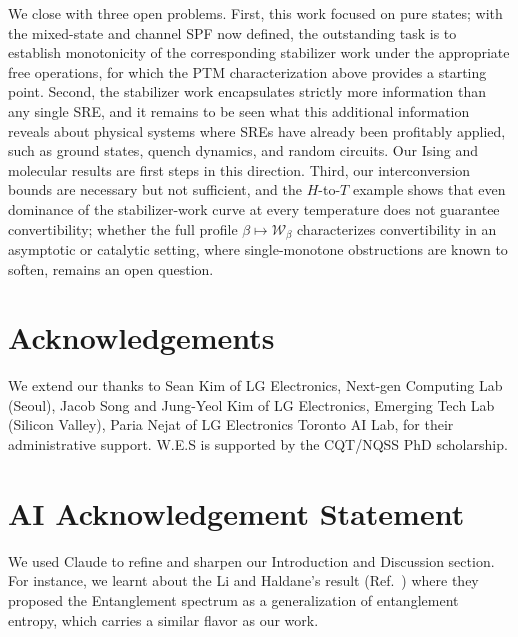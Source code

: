 \documentclass[aps,pra,superscriptaddress,twocolumn,longbibliography]{revtex4-2}
\begin{document}
We close with three open problems. First, this work focused on pure states; with the mixed-state and channel SPF now defined, the outstanding task is to establish monotonicity of the corresponding stabilizer work under the appropriate free operations, for which the PTM characterization above provides a starting point. 
 Second, the stabilizer work encapsulates strictly more information than any single SRE, and it remains to be seen what this additional information reveals about physical systems where SREs have already been profitably applied, such as ground states, quench dynamics, and random circuits. 
Our Ising and molecular results are first steps in this direction. 
Third, our interconversion bounds are necessary but not sufficient, and the $H$-to-$T$ example shows that even dominance of the stabilizer-work curve at every temperature does not guarantee convertibility; whether the full profile $\beta\mapsto\mathcal{W}_{\beta}$ characterizes convertibility in an asymptotic or catalytic setting, where single-monotone obstructions are known to soften, remains an open question.



\section*{Acknowledgements}
We extend our thanks to Sean Kim of LG Electronics, Next-gen Computing Lab (Seoul), Jacob Song and Jung-Yeol Kim of LG Electronics, Emerging Tech Lab (Silicon Valley), Paria Nejat of LG Electronics Toronto AI Lab, for their administrative support. W.E.S is supported by the CQT/NQSS PhD scholarship.
\section*{AI Acknowledgement Statement}
We used Claude to refine and sharpen our Introduction and Discussion section. For instance, we learnt about the Li and Haldane's result (Ref.~\cite{Li_Haldane/Entanglement_Spectrum/2008}) where they proposed the Entanglement spectrum as a generalization of entanglement entropy, which carries a similar flavor as our work.




\pagebreak

\onecolumngrid
\newpage
\end{document}
